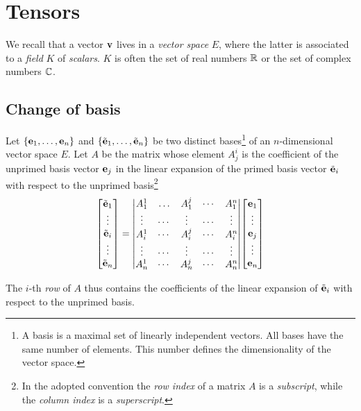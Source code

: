 \appendix
\chapter{Tensors}
\label{ch:Tensors} 
We recall that a vector $\vb{v}$ lives in a \textit{vector space} $E$, where the latter is associated to a \textit{field} $K$ of \textit{scalars}. $K$ is often the set of real numbers $\mathbb{R}$ or the set of complex numbers $\mathbb{C}$. 

\section{Change of basis}
Let $\{\vb{e}_1, \ldots, \vb{e}_n \}$ and $\{\tilde{\vb{e}}_1, \ldots, \tilde{\vb{e}}_n \}$ be two distinct bases\footnote{A basis is a maximal set of linearly independent vectors. All bases have the same number of elements. This number defines the dimensionality of the vector space.} of an $n$-dimensional vector space $E$.  
Let $A$ be the matrix whose element $A^i_j$ is the coefficient of the unprimed basis vector $\vb{e}_j$ in the linear expansion of the primed basis vector $\tilde{\vb{e}}_i$ with respect to the unprimed basis\footnote{In the adopted convention the \textit{row index} of a matrix $A$ is a \textit{subscript}, while the \textit{column index} is a \textit{superscript}.} 
\begin{align}
\label{eq:primed_from_unprimed}
\mqty[ \tilde{\vb{e}}_1 \\ \vdots \\ \tilde{\vb{e}}_i \\ \vdots \\ \tilde{\vb{e}}_n ] = \mqty|
A^1_1   &  \ldots  & A^j_1   &  \cdots  & A^n_1  \\
\vdots  &  \cdots  & \vdots  &  \cdots  & \vdots \\
A^1_i   &  \cdots  & A^j_i   &  \cdots  & A^n_i  \\
\vdots  &  \cdots  & \vdots  &  \cdots  & \vdots \\
A^1_n   &  \cdots  & A^j_n   &  \cdots  & A^n_n  |
\mqty[ \vb{e}_1 \\ \vdots \\ \vb{e}_j \\ \vdots \\ \vb{e}_n ]  
\end{align}

The $i$-th \textit{row} of $A$ thus contains the coefficients of the linear expansion of $\tilde{\vb{e}}_i$ with respect to the unprimed basis. 

